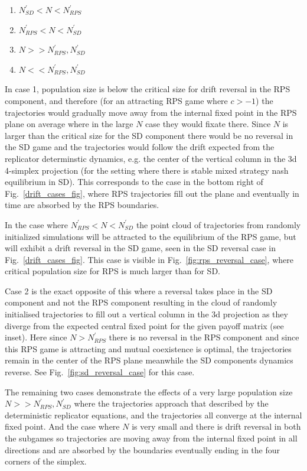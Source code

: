 \documentclass[%
 reprint,
 amsmath,amssymb,
 aps,
]{revtex4-2}
\begin{document}
\begin{enumerate}%
  \centering
  \item $N^\prime_{SD} < N < N^\prime_{RPS}$
  \item $N^\prime_{RPS} < N < N^\prime_{SD}$
  \item $N >> N^\prime_{RPS}, N^\prime_{SD}$
  \item $N << N^\prime_{RPS}, N^\prime_{SD}$
\end{enumerate}

In case 1, population size is below the critical size for 
drift reversal in the RPS component, and therefore 
(for an attracting RPS game where $c > -1$) the trajectories would 
gradually move away from the internal fixed point in the RPS plane 
on average where in the large $N$ case they would fixate there.
Since $N$ is larger than the critical size for the SD component there 
would be no reversal in the SD game and the trajectories would follow the 
drift expected from the replicator determinstic dynamics, e.g. the 
center of the vertical column in the 3d 4-simplex projection (for the
setting where there is stable mixed strategy nash equilibrium in SD).
This corresponds to the case in the bottom right of Fig.~\ref{drift_cases_fig}, 
where RPS trajectories fill out the plane and eventually in time are absorbed by 
the RPS boundaries.

In the case where $N^\prime_{RPS} < N < N^\prime_{SD}$ the point cloud of trajectories from 
randomly initialized simulations will be attracted to the equilibrium of the RPS game, but will
exhibit a drift reversal in the SD game, seen in the SD reversal case in Fig.~\ref{drift_cases_fig}.
This case is visible in Fig.~\ref{fig:rps_reversal_case}, where critical population size 
for RPS is much larger than for SD.


Case 2 is the exact opposite of this where a reversal takes place in 
the SD component and not the RPS component resulting in the 
cloud of randomly initialised trajectories to 
fill out a vertical column in the 3d projection as they diverge
from the expected central fixed point for the given payoff matrix (see inset).
Here since $N > N^\prime_{RPS}$ there is no reversal in the RPS component
and since this RPS game is attracting and mutual coexistence is optimal, the 
trajectories remain in the center of the RPS plane meanwhile the SD components
dynamics reverse. See Fig.~\ref{fig:sd_reversal_case} for this case.

The remaining two cases demonstrate the effects of a very large population size 
$N >> N^\prime_{RPS}, N^\prime_{SD}$ where the trajectories
approach that described by the deterministic replicator equations, and 
the trajectories all converge at the internal fixed point. 
And the case where $N$ is very small and there is drift reversal 
in both the subgames so trajectories are moving away from the internal fixed point 
in all directions and are absorbed by the boundaries eventually 
ending in the four corners of the simplex.
\end{document}
